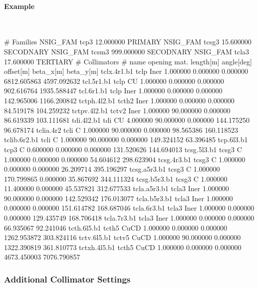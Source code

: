 \paragraph{Example}~

\begin{cverbatim}
# Families
NSIG_FAM tcp3      12.000000 PRIMARY
NSIG_FAM tcsg3     15.600000 SECODNARY
NSIG_FAM tcsm3    999.000000 SECODNARY
NSIG_FAM tcla3     17.600000 TERTIARY
# Collimators
# name          opening mat.   length[m]  angle[deg]  offset[m]    beta_x[m]    beta_y[m]
tclx.4r1.b1        tclp Iner    1.000000    0.000000   0.000000  6812.605863  4597.092632
tcl.5r1.b1         tclp CU      1.000000    0.000000   0.000000   902.616764  1935.588447
tcl.6r1.b1         tclp Iner    1.000000    0.000000   0.000000   142.965006  1166.200842
tctph.4l2.b1      tcth2 Iner    1.000000    0.000000   0.000000    84.519178   104.259232
tctpv.4l2.b1      tctv2 Iner    1.000000   90.000000   0.000000    86.619339   103.111681
tdi.4l2.b1          tdi CU      4.000000   90.000000   0.000000   144.175250    96.678174
tclia.4r2          tcli C       1.000000   90.000000   0.000000    98.565386   160.118523
tclib.6r2.b1       tcli C       1.000000   90.000000   0.000000   149.324152    63.396485
tcp.6l3.b1         tcp3 C       0.600000    0.000000   0.000000   131.520626   144.694013
tcsg.5l3.b1       tcsg3 C       1.000000    0.000000   0.000000    54.604612   298.623904
tcsg.4r3.b1       tcsg3 C       1.000000    0.000000   0.000000    26.209714   395.196297
tcsg.a5r3.b1      tcsg3 C       1.000000  170.799865   0.000000    35.867692   344.111324
tcsg.b5r3.b1      tcsg3 C       1.000000   11.400000   0.000000    45.537821   312.677533
tcla.a5r3.b1      tcla3 Iner    1.000000   90.000000   0.000000   142.529342   176.013077
tcla.b5r3.b1      tcla3 Iner    1.000000    0.000000   0.000000   151.614782   168.687046
tcla.6r3.b1       tcla3 Iner    1.000000    0.000000   0.000000   129.435749   168.706418
tcla.7r3.b1       tcla3 Iner    1.000000    0.000000   0.000000    66.935067    92.241046
tcth.6l5.b1       tcth5 CuCD    1.000000    0.000000   0.000000  1262.953872   303.824116
tctv.6l5.b1       tctv5 CuCD    1.000000   90.000000   0.000000  1322.390819   361.810773
tctxh.4l5.b1      tcth5 CuCD    1.000000    0.000000   0.000000  4673.450003  7076.790857
\end{cverbatim}

\subsubsection{Additional Collimator Settings}

